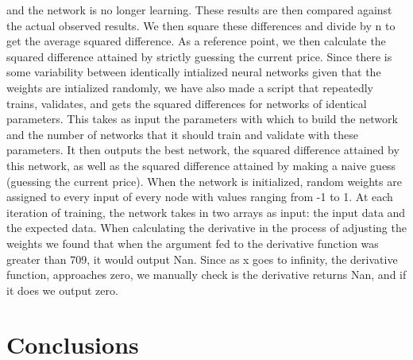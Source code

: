 \documentclass[a4paper,10pt]{article}
\begin{document}
and the network is no longer learning.  These results are then compared against the actual observed results.  We then square these
differences and divide by n to get the average squared difference.  As a reference point, we then calculate the squared difference
attained by strictly guessing the current price.  
\newline \newline
Since there is some variability between identically intialized neural networks given that the weights are intialized randomly, 
we have also made a script that repeatedly trains, validates, and gets the squared differences for networks of identical 
parameters.  This takes as input the parameters with which to build the network and the number of networks that it should
train and validate with these parameters.  It then outputs the best network, the squared difference attained by this network,
as well as the squared difference attained by making a naive guess (guessing the current price).
\newline \newline
When the network is initialized, random weights are assigned to every input of every node with values ranging from -1 to 1.
At each iteration of training, the network takes in two arrays as input: the input data and the expected data.  When calculating
the derivative in the process of adjusting the weights we found that when the argument fed to the derivative function was
greater than 709, it would output Nan.  Since as x goes to infinity, the derivative function, approaches zero, we manually
check is the derivative returns Nan, and if it does we output zero.
\section{Conclusions}
\end{document}
